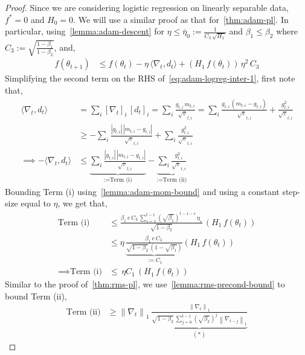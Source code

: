 \documentclass{article}
\newcommand{\ti}[1]{#1_{t,i}}
\newcommand{\norm}[1]{\left\|#1 \right\|}
\newcommand{\tht}{\theta_t}
\newcommand{\thtt}{\theta_{t+1}}
\begin{document}
\begin{proof}
Since we are considering logistic regression on linearly separable data, $f^* = 0$ and $H_0 = 0$. We will use a similar proof as that for~\cref{thm:adam-pl}. In particular, using~\cref{lemma:adam-descent} for $\eta \leq \bar{\eta}_0 := \frac{1}{C_3 \, \sqrt{H_1}}$ and $\beta_1 \leq \beta_2$ where $C_3 := \sqrt{\frac{1 - \beta_1}{1 - \beta_2}}$, and, 
\begin{align}
f(\thtt) & \leq f(\tht) - \eta \, \langle \nabla_t, d_t \rangle +  \left(H_1 \, f(\tht) \right) \, \eta^2 \, C_3 \label{eq:adam-logreg-inter-1}    
\end{align}
Simplifying the second term on the RHS of~\cref{eq:adam-logreg-inter-1}, first note that, 
\begin{align}
\langle \nabla_t, d_t \rangle &= \sum_i [\nabla_t]_i \, [d_t]_i = \sum_i \frac{\ti{g} \, \ti{m}}{\ti{\sqrt{v}}} = \sum_i \frac{\ti{g} \, (\ti{m} - \ti{g})}{\ti{\sqrt{v}}} + \frac{\ti{g^2}}{\ti{\sqrt{v}}} \nonumber \\
& \geq -\sum_i \frac{|\ti{g}| \, |\ti{m} - \ti{g}|}{\ti{\sqrt{v}}} + \sum_i \frac{\ti{g^2}}{\ti{\sqrt{v}}} \nonumber \\
\implies - \langle \nabla_t, d_t \rangle & \leq \underbrace{\sum_i \frac{|\ti{g}| \, |\ti{m} - \ti{g}|}{\ti{\sqrt{v}}}}_{:= \text{Term (i)}} - \underbrace{\sum_i \frac{\ti{g^2}}{\ti{\sqrt{v}}}}_{:= \text{Term (ii)}} \label{eq:adam-logreg-secondterm-1}
\end{align}
Bounding Term (i) using~\cref{lemma:adam-mom-bound} and using a constant step-size equal to $\eta$, we get that, 
\begin{align}
\text{Term (i)} & \leq  \frac{\beta_1\,e \, C_3 \, \sum_{s = 1}^{t-1} (\sqrt{\beta_1})^{t-1-s} \, \eta_{s}}{\sqrt{1 - \beta_2}} \, ( H_1 \, f(\tht)) \\
& \leq \eta \, \underbrace{\frac{\beta_1\,e \, C_3 \, }{\sqrt{1 - \beta_2} \, (1 - \sqrt{\beta_1})}}_{:= C_1} ( H_1 \, f(\tht)) \tag{Since $\eta_s = \eta$} \\
\implies \text{Term (i)} &  \leq \, \eta C_1 \,  (H_1 \, f(\tht)) \label{eq:adam-logreg-secondterm-2} 
\end{align}
Similar to the proof of~\cref{thm:rms-pl}, we use~\cref{lemma:rms-precond-bound} to bound Term (ii), 
\begin{align}
\text{Term (ii)} & \geq \norm{\nabla_t}_1 \, \underbrace{\frac{\norm{\nabla_t}_1}{\sqrt{1 - \beta_2} \, \sum_{j = 0}^{t-1} (\sqrt{\beta_2})^{j} \, \norm{\nabla_{t-j}}_1}}_{(*)} \label{eq:adam-logreg-secondterm-3} 
\end{align}



\end{proof}
\end{document}
